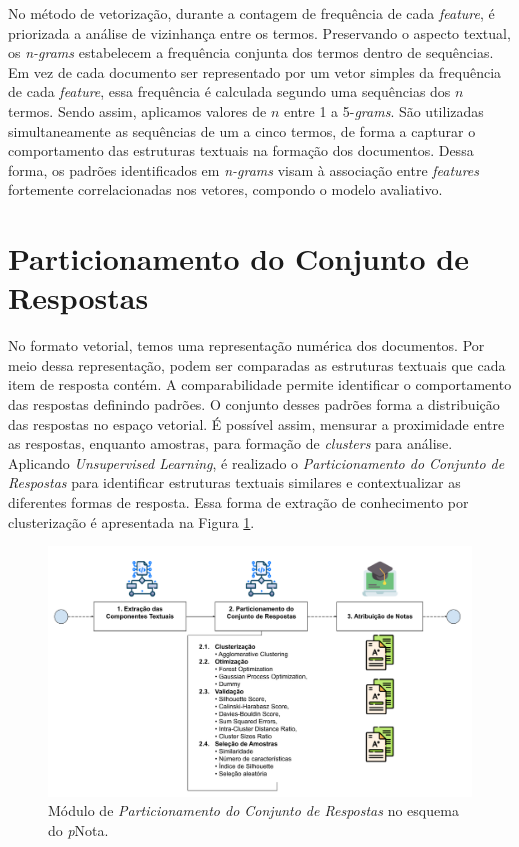 No método de vetorização, durante a contagem de frequência de cada \textit{feature}, é priorizada a análise de vizinhança entre os termos. Preservando o aspecto textual, os \textit{n-grams} estabelecem a frequência conjunta dos termos dentro de sequências. Em vez de cada documento ser representado por um vetor simples da frequência de cada \textit{feature}, essa frequência é calculada segundo uma sequências dos $ n $ termos. Sendo assim, aplicamos valores de $ n $ entre 1 a 5-\textit{grams}. São utilizadas simultaneamente as sequências de um a cinco termos, de forma a capturar o comportamento das estruturas textuais na formação dos documentos. Dessa forma, os padrões identificados em \textit{n-grams} \cite{spalenza2020} visam à associação entre \textit{features} fortemente correlacionadas nos vetores, compondo o modelo avaliativo.


\section{Particionamento do Conjunto de Respostas}
\label{sec-amostragem}

No formato vetorial, temos uma representação numérica dos documentos. Por meio dessa representação, podem ser comparadas as estruturas textuais que cada item de resposta contém. A comparabilidade permite identificar o comportamento das respostas definindo padrões. O conjunto desses padrões forma a distribuição das respostas no espaço vetorial. É possível assim, mensurar a proximidade entre as respostas, enquanto amostras, para formação de \textit{clusters} para análise. Aplicando \textit{Unsupervised Learning}, é realizado o \textit{Particionamento do Conjunto de Respostas} para identificar estruturas textuais similares e contextualizar as diferentes formas de resposta. Essa forma de extração de conhecimento por clusterização é apresentada na Figura \ref{fig-pcr}.

\begin{figure}[!h]
\centering
\includegraphics[width=\textwidth]{figuras/esquema-pcr-pNota.png}
\caption{Módulo de \textit{Particionamento do Conjunto de Respostas} no esquema do \textit{p}Nota.}
\label{fig-pcr}
\end{figure}

